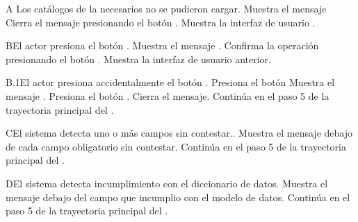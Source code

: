     \begin{UCtrayectoriaA}{A}{ Los catálogos de la  necesarios no se pudieron cargar.}
    	\UCpaso Muestra el mensaje 
    	\UCpaso[\UCactor] Cierra el mensaje presionando el botón .
    	\UCpaso Muestra la interfaz de usuario .
    \end{UCtrayectoriaA}

    \begin{UCtrayectoriaA}{B}{El actor presiona el botón .}
    	\UCpaso Muestra el mensaje .
    	\UCpaso[\UCactor] Confirma la operación presionando el botón .
    	\UCpaso Muestra la interfaz de usuario anterior.
    \end{UCtrayectoriaA}

    \begin{UCtrayectoriaA}{B.1}{El actor presiona accidentalmente el botón .}
    	\UCpaso[\UCactor] Presiona el botón 
    	\UCpaso Muestra el mensaje .
    	\UCpaso[\UCactor] Presiona el botón .
    	\UCpaso Cierra el mensaje.
    	\UCpaso Continúa en el paso 5 de la trayectoria principal del .
    \end{UCtrayectoriaA}

    \begin{UCtrayectoriaA}{C}{El sistema detecta uno o más campos sin contestar..}
    	\UCpaso Muestra el mensaje  debajo de cada campo obligatorio sin contestar.
    	\UCpaso Continúa en el paso 5 de la trayectoria principal del .
    \end{UCtrayectoriaA}

    \begin{UCtrayectoriaA}{D}{El sistema detecta incumplimiento con el diccionario de datos.}
    	\UCpaso Muestra el mensaje  debajo del campo que incumplio con el modelo de datos.
    	\UCpaso Continúa en el paso 5 de la trayectoria principal del .
    \end{UCtrayectoriaA}

